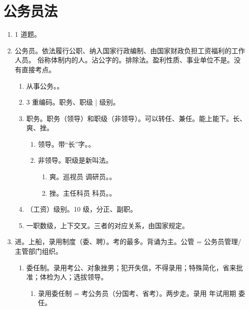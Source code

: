 \section{公务员法}
\begin{enumerate}
  \item 1 道题。
  \item 公务员。依法履行公职、纳入国家行政编制、由国家财政负担工资福利的工作人员。
        俗称体制内的人。沾公字的。排除法。盈利性质、事业单位不是。没有直接考点。
        \begin{enumerate}
          \item 从事公务。。
          \item 3 重编码。职务、职级 | 级别。
          \item 职务。职务（领导）和职级（非领导）。\yi 可以转任、兼任。\er 能上能下。长、爽、挫。
                \begin{enumerate}
                  \item 领导。带“长”字。。
                  \item 非领导。职级是新叫法。
                        \begin{enumerate}
                          \item 爽。巡视员 \dy 调研员。。
                          \item 挫。主任科员 \dy 科员。。
                        \end{enumerate}
                \end{enumerate}
          \item （工资）级别。10 级，分正、副职。
          \item 一职数级，上下交叉。三者的对应关系，由国家规定。
        \end{enumerate}
  \item 进。上船，录用制度（委、聘）。考的最多。背诵为主。公管 = 公务员管理/主管部门组织。
        \begin{enumerate}
          \item 委任制。录用考公、对象挫男；犯开失信，不得录用；特殊简化，省来批准；体检为人；选拔领导。
                \begin{enumerate}
                  \item 录用委任制 = 考公务员（分国考、省考）。两步走。录用  年试用期 \yjt 委任。
                        \begin{enumerate}

\end{enumerate}
\end{enumerate}
\end{enumerate}
\end{enumerate}
